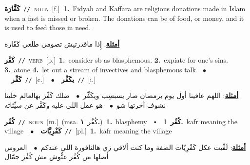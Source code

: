 \documentclass[10pt,a4paper,twoside]{article} %
\begin{document}
\begin{multicols}{2}
{\setlength\topsep{0pt}\textbf{\foreignlanguage{arabic}{كَفَّارَة}}\ {\color{gray}\texttt{//}\color{black}}\ \textsc{noun}\ [f.]\ \textbf{1.}~Fidyah and Kaffara are religious donations made in Islam when a fast is missed or broken. The donations can be of food, or money, and it is used to feed those in need.\  \begin{flushright}\color{gray}\foreignlanguage{arabic}{\textbf{\underline{\foreignlanguage{arabic}{أمثلة}}}: إِذا ماقدرتيش تصومي طلعي كَفّارة}\end{flushright}\color{black}} \vspace{2mm}

{\setlength\topsep{0pt}\textbf{\foreignlanguage{arabic}{كَفَّر}}\ {\color{gray}\texttt{//}\color{black}}\ \textsc{verb}\ [p.]\ \textbf{1.}~consider sb as blasphemous.  \textbf{2.}~expiate for one's sins.  \textbf{3.}~atone  \textbf{4.}~let out a stream of invectives and blasphemous talk\ \ $\bullet$\ \ \setlength\topsep{0pt}\textbf{\foreignlanguage{arabic}{كَفِّر}}\ {\color{gray}\texttt{//}\color{black}}\ [c.]\ \ $\bullet$\ \ \setlength\topsep{0pt}\textbf{\foreignlanguage{arabic}{يكَفِّر}}\ {\color{gray}\texttt{//}\color{black}}\ [i.]\  \begin{flushright}\color{gray}\foreignlanguage{arabic}{\textbf{\underline{\foreignlanguage{arabic}{أمثلة}}}: اللهم عافينا أول يوم برمضان صار يسبسِب ويكَفِّر\ $\bullet$\ \  ضلك كَفِّر بهالعالم خلينا نشوف آخرتها شو\ $\bullet$\ \  هو عمل اللي عليه وكَفَّر عن سيِّئاته}\end{flushright}\color{black}} \vspace{2mm}

{\setlength\topsep{0pt}\textbf{\foreignlanguage{arabic}{كُفُر}}\ {\color{gray}\texttt{//}\color{black}}\ \textsc{noun}\ [m.]\ \color{gray}(msa. \foreignlanguage{arabic}{كُفْر}~\foreignlanguage{arabic}{\textbf{١.}})\color{black}\ \textbf{1.}~blasphemy\ \ $\smblkdiamond$\ \ \setlength\topsep{0pt}\textbf{\foreignlanguage{arabic}{كُفُر}}\ \textbf{1.}~kafr meaning the village\ \ $\bullet$\ \ \setlength\topsep{0pt}\textbf{\foreignlanguage{arabic}{كَفْرِيَّات}}\ {\color{gray}\texttt{//}\color{black}}\ [pl.]\ \textbf{1.}~kafr meaning the village\  \begin{flushright}\color{gray}\foreignlanguage{arabic}{\textbf{\underline{\foreignlanguage{arabic}{أمثلة}}}: لَفِّيت عكل كَفْرِيّات الضفة وما كنت ألاقي زي هالنافورة اللي عندكم\ $\bullet$\ \  العروس أصلها من كُفُر عبُّوش مش كُفُر جمّال}\end{flushright}\color{black}} \vspace{2mm}


\end{multicols}
\end{document}
